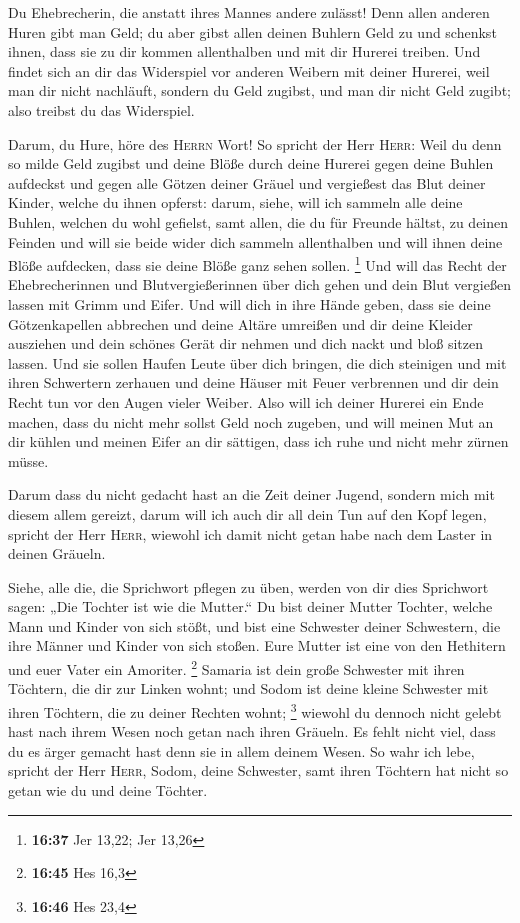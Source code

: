  Du Ehebrecherin, die anstatt ihres Mannes andere
zulässt!  Denn allen anderen Huren gibt man Geld; du aber
gibst allen deinen Buhlern Geld zu und schenkst ihnen, dass sie zu dir
kommen allenthalben und mit dir Hurerei treiben.  Und
findet sich an dir das Widerspiel vor anderen Weibern mit deiner
Hurerei, weil man dir nicht nachläuft, sondern du Geld zugibst, und man
dir nicht Geld zugibt; also treibst du das Widerspiel.

 Darum, du Hure, höre des \textsc{Herrn} Wort!
 So spricht der Herr \textsc{Herr}: Weil du denn so milde
Geld zugibst und deine Blöße durch deine Hurerei gegen deine Buhlen
aufdeckst und gegen alle Götzen deiner Gräuel und vergießest das Blut
deiner Kinder, welche du ihnen opferst:  darum, siehe,
will ich sammeln alle deine Buhlen, welchen du wohl gefielst, samt
allen, die du für Freunde hältst, zu deinen Feinden und will sie beide
wider dich sammeln allenthalben und will ihnen deine Blöße aufdecken,
dass sie deine Blöße ganz sehen sollen. \footnote{\textbf{16:37} Jer
  13,22; Jer 13,26}  Und will das Recht der
Ehebrecherinnen und Blutvergießerinnen über dich gehen und dein Blut
vergießen lassen mit Grimm und Eifer.  Und will dich in
ihre Hände geben, dass sie deine Götzenkapellen abbrechen und deine
Altäre umreißen und dir deine Kleider ausziehen und dein schönes Gerät
dir nehmen und dich nackt und bloß sitzen lassen.  Und
sie sollen Haufen Leute über dich bringen, die dich steinigen und mit
ihren Schwertern zerhauen  und deine Häuser mit Feuer
verbrennen und dir dein Recht tun vor den Augen vieler Weiber. Also will
ich deiner Hurerei ein Ende machen, dass du nicht mehr sollst Geld noch
zugeben,  und will meinen Mut an dir kühlen und meinen
Eifer an dir sättigen, dass ich ruhe und nicht mehr zürnen müsse.

 Darum dass du nicht gedacht hast an die Zeit deiner
Jugend, sondern mich mit diesem allem gereizt, darum will ich auch dir
all dein Tun auf den Kopf legen, spricht der Herr \textsc{Herr}, wiewohl
ich damit nicht getan habe nach dem Laster in deinen Gräueln.

 Siehe, alle die, die Sprichwort pflegen zu üben, werden
von dir dies Sprichwort sagen: „Die Tochter ist wie die Mutter.``
 Du bist deiner Mutter Tochter, welche Mann und Kinder
von sich stößt, und bist eine Schwester deiner Schwestern, die ihre
Männer und Kinder von sich stoßen. Eure Mutter ist eine von den
Hethitern und euer Vater ein Amoriter. \footnote{\textbf{16:45} Hes 16,3}
 Samaria ist dein große Schwester mit ihren Töchtern, die
dir zur Linken wohnt; und Sodom ist deine kleine Schwester mit ihren
Töchtern, die zu deiner Rechten wohnt; \footnote{\textbf{16:46} Hes 23,4}
 wiewohl du dennoch nicht gelebt hast nach ihrem Wesen
noch getan nach ihren Gräueln. Es fehlt nicht viel, dass du es ärger
gemacht hast denn sie in allem deinem Wesen.  So wahr ich
lebe, spricht der Herr \textsc{Herr}, Sodom, deine Schwester, samt ihren
Töchtern hat nicht so getan wie du und deine Töchter.

